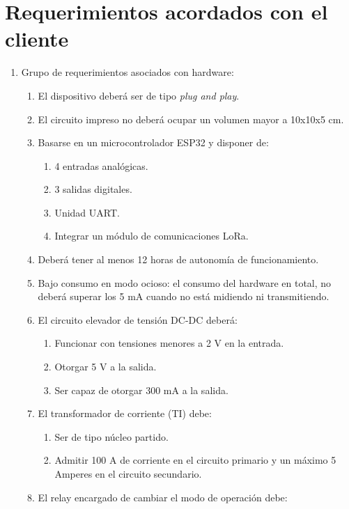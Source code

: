 \section{Requerimientos acordados con el cliente}
\label{sec:requerimientos}
\begin{enumerate}
	\item Grupo de requerimientos asociados con hardware:
	\begin{enumerate}
		\item El dispositivo deberá ser de tipo \textit{plug and play}.
		\item El circuito impreso no deberá ocupar un volumen mayor a 10x10x5 cm.
		\item Basarse en un microcontrolador ESP32 y disponer de:
		\begin{enumerate}%
			\item 4 entradas analógicas.
			\item 3 salidas digitales.
			\item Unidad UART.
			\item Integrar un módulo de comunicaciones LoRa.
		\end{enumerate}
		\item Deberá tener al menos 12 horas de autonomía de funcionamiento.
		\item Bajo consumo en modo ocioso: el consumo del hardware en total, no deberá superar los 5 mA cuando no está midiendo ni transmitiendo.
		\item El circuito elevador de tensión DC-DC deberá:
		\begin{enumerate}%
			\item Funcionar con tensiones menores a 2 V en la entrada.
			\item Otorgar 5 V a la salida.
			\item Ser capaz de otorgar 300 mA a la salida.
		\end{enumerate}
		\item El transformador de corriente (TI) debe:
		\begin{enumerate}%
			\item Ser de tipo núcleo partido.
			\item Admitir 100 A de corriente en el circuito primario y un máximo 5 Amperes en el circuito secundario.
		\end{enumerate}
		\item \label{req_relay} El relay encargado de cambiar el modo de operación debe:
		\begin{enumerate}%

\end{enumerate}
\end{enumerate}
\end{enumerate}
